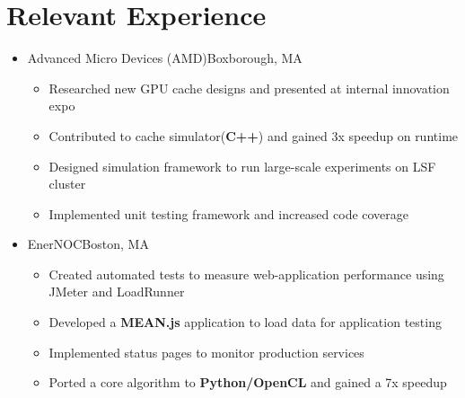 \documentclass[11pt,letterpaper,sans]{moderncv}
\begin{document}
\section{Relevant Experience}

\vspace{6pt}

\begin{itemize}


\item[] {
{Advanced Micro Devices (AMD)}{Boxborough, MA}{}{\vspace{3pt}}
\vspace{-3mm}	\begin{itemize}
	 \item Researched new GPU cache designs and presented at internal innovation expo
	 \item Contributed to cache simulator(\textbf{C++}) and gained 3x speedup on runtime
	 \item Designed simulation framework to run large-scale experiments on LSF cluster
	 \item Implemented unit testing framework and increased code coverage
	\end{itemize}
}
\vspace{6pt}

\item[] {
{EnerNOC}{Boston, MA}{}{\vspace{3pt}}
\vspace{-3mm}	\begin{itemize}
	 \item Created automated tests to measure 
web-application performance using JMeter and LoadRunner
	 \item Developed a \textbf{MEAN.js} application to load data for application testing
	 \item Implemented status pages to monitor production services
	 \item Ported a core algorithm to \textbf{Python/OpenCL} and gained a 7x speedup
	\end{itemize}
}
\vspace{6pt}



\end{itemize}
\end{document}

